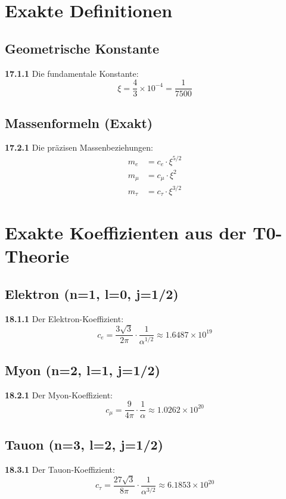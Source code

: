 \section{Exakte Definitionen}

\subsection{Geometrische Konstante}
\noindent \textbf{17.1.1} Die fundamentale Konstante:
\begin{equation}
	\xi = \frac{4}{3} \times 10^{-4} = \frac{1}{7500}
\end{equation}

\subsection{Massenformeln (Exakt)}
\noindent \textbf{17.2.1} Die präzisen Massenbeziehungen:
\begin{align}
	m_e &= c_e \cdot \xi^{5/2} \\
	m_\mu &= c_\mu \cdot \xi^2 \\
	m_\tau &= c_\tau \cdot \xi^{3/2}
\end{align}

\section{Exakte Koeffizienten aus der T0-Theorie}

\subsection{Elektron (n=1, l=0, j=1/2)}
\noindent \textbf{18.1.1} Der Elektron-Koeffizient:
\begin{equation}
	c_e = \frac{3\sqrt{3}}{2\pi} \cdot \frac{1}{\alpha^{1/2}} \approx 1.6487 \times 10^{19}
\end{equation}

\subsection{Myon (n=2, l=1, j=1/2)}
\noindent \textbf{18.2.1} Der Myon-Koeffizient:
\begin{equation}
	c_\mu = \frac{9}{4\pi} \cdot \frac{1}{\alpha} \approx 1.0262 \times 10^{20}
\end{equation}

\subsection{Tauon (n=3, l=2, j=1/2)}
\noindent \textbf{18.3.1} Der Tauon-Koeffizient:
\begin{equation}
	c_\tau = \frac{27\sqrt{3}}{8\pi} \cdot \frac{1}{\alpha^{3/2}} \approx 6.1853 \times 10^{20}
\end{equation}

